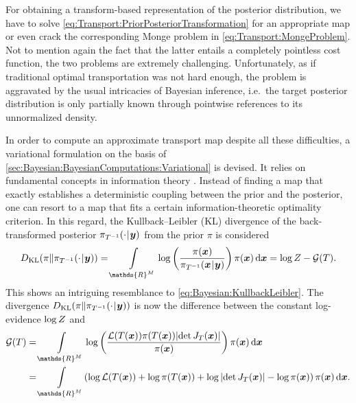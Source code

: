 For obtaining a transform-based representation of the posterior distribution, we have to solve \cref{eq:Transport:PriorPosteriorTransformation} for an appropriate map
or even crack the corresponding Monge problem in \cref{eq:Transport:MongeProblem}.
Not to mention again the fact that the latter entails a completely pointless cost function, the two problems are extremely challenging.
Unfortunately, as if traditional optimal transportation was not hard enough, the problem is aggravated by the usual intricacies of Bayesian inference,
i.e.\ the target posterior distribution is only partially known through pointwise references to its unnormalized density.
\par %
In order to compute an approximate transport map despite all these difficulties, a variational formulation on the basis of \cref{sec:Bayesian:BayesianComputations:Variational} is devised.
It relies on fundamental concepts in information theory \cite{Statistics:Soofi2010,Statistics:Ebrahimi2010}.
Instead of finding a map that exactly establishes a deterministic coupling between the prior and the posterior,
one can resort to a map that fits a certain information-theoretic optimality criterion.
In this regard, the Kullback--Leibler (KL) divergence of the back-transformed posterior \(\pi_{T^{-1}}(\cdot {\:\!}|{\:\!} \bm{y})\) from the prior \(\pi\) is considered
\begin{equation} \label{eq:Transport:KullbackLeibler}
  D_{\mathrm{KL}}(\pi \| \pi_{\map^{-1}}(\cdot \cond \bm{y}))
  = \int\limits_{\mathds{R}^\dimParam} \log \left( \frac{\pi(\bm{x})}{\pi_{\map^{-1}}(\bm{x} \cond \bm{y})} \right) \pi(\bm{x}) \, \mathrm{d} \bm{x}
  = \log \scale - \mathcal{G}(\map).
\end{equation}
This shows an intriguing resemblance to \cref{eq:Bayesian:KullbackLeibler}.
The divergence \(D_{\mathrm{KL}}(\pi \| \pi_{T^{-1}}(\cdot {\:\!}|{\:\!} \bm{y}))\) is now the difference between the constant log-evidence \(\log Z\) and
\begin{equation} \label{eq:Transport:FreeEnergy}
  \begin{aligned}
    \mathcal{G}(\map)
    &= \int\limits_{\mathds{R}^\dimParam}
    \log \left( \frac{\mathcal{L}(\map(\bm{x})) \pi(\map(\bm{x})) \lvert \det J_\map(\bm{x}) \rvert}{\pi(\bm{x})} \right) \pi(\bm{x}) \, \mathrm{d} \bm{x} \\
    &= \int\limits_{\mathds{R}^\dimParam}
    (\log \mathcal{L}(\map(\bm{x})) + \log \pi(\map(\bm{x})) + \log \, \lvert \det J_\map(\bm{x}) \rvert - \log \pi(\bm{x})) \, \pi(\bm{x}) \, \mathrm{d} \bm{x}.
  \end{aligned}
\end{equation}
